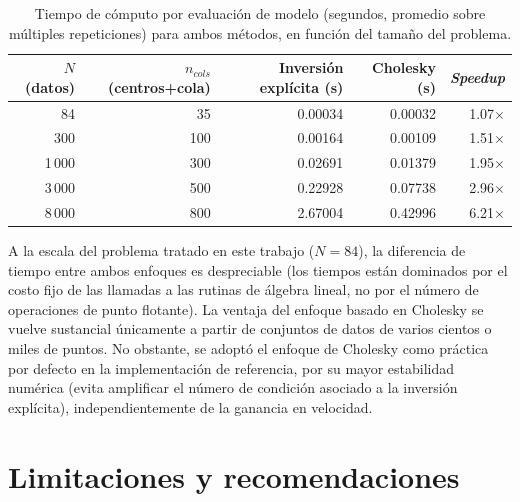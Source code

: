 \documentclass[11pt,a4paper]{article}
\begin{document}
\begin{table}[htbp]
\centering
\caption{Tiempo de c\'omputo por evaluaci\'on de modelo (segundos, promedio
sobre m\'ultiples repeticiones) para ambos m\'etodos, en funci\'on del tama\~no
del problema.}
\label{tab:cholesky}
\begin{tabular}{@{}rrrrr@{}}
\toprule
$N$ (datos) & $n_{cols}$ (centros+cola) & Inversi\'on expl\'icita (s) &
Cholesky (s) & \emph{Speedup} \\
\midrule
84    & 35  & 0.00034 & 0.00032 & 1.07$\times$ \\
300   & 100 & 0.00164 & 0.00109 & 1.51$\times$ \\
1\,000  & 300 & 0.02691 & 0.01379 & 1.95$\times$ \\
3\,000  & 500 & 0.22928 & 0.07738 & 2.96$\times$ \\
8\,000  & 800 & 2.67004 & 0.42996 & 6.21$\times$ \\
\bottomrule
\end{tabular}
\end{table}

A la escala del problema tratado en este trabajo ($N=84$), la diferencia de
tiempo entre ambos enfoques es despreciable (los tiempos est\'an dominados por
el costo fijo de las llamadas a las rutinas de \'algebra lineal, no por el
n\'umero de operaciones de punto flotante). La ventaja del enfoque basado en
Cholesky se vuelve sustancial \'unicamente a partir de conjuntos de datos de
varios cientos o miles de puntos. No obstante, se adopt\'o el enfoque de
Cholesky como pr\'actica por defecto en la implementaci\'on de referencia, por
su mayor estabilidad num\'erica (evita amplificar el n\'umero de condici\'on
asociado a la inversi\'on expl\'icita), independientemente de la ganancia en
velocidad.

\section{Limitaciones y recomendaciones}
\end{document}
